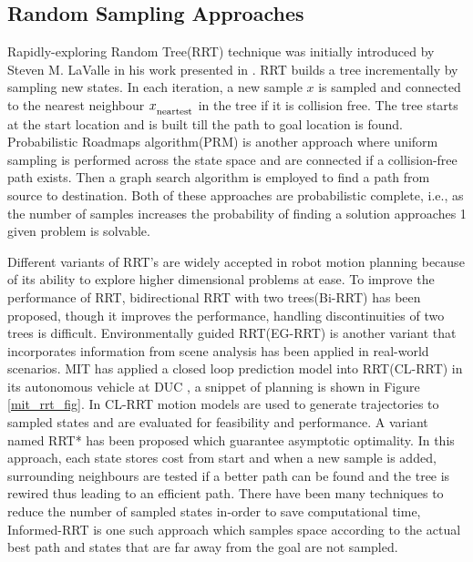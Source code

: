 \subsection{Random Sampling Approaches}
\label{rw_incremental_search}
Rapidly-exploring Random Tree(RRT) technique was initially introduced by Steven M. LaValle in his work presented in \cite{Lavalle_rrt}. RRT builds a tree incrementally by sampling new states. In each iteration, a new sample $x$ is sampled and connected to the nearest neighbour $x_\textsubscript{neartest}$ in the tree if it is collision free. The tree starts at the start location and is built till the path to goal location is found. Probabilistic Roadmaps algorithm\cite{prm}(PRM) is another approach where uniform sampling is performed across the state space and are connected if a collision-free path exists. Then a graph search algorithm is employed to find a path from source to destination. Both of these approaches are probabilistic complete, i.e., as the number of samples increases the probability of finding a solution approaches 1 given problem is solvable.


Different variants of RRT's are widely accepted in robot motion planning because of its ability to explore higher dimensional problems at ease\cite{rrt_higher_dimension}. To improve the performance of RRT, bidirectional RRT with two trees(Bi-RRT) has been proposed, though it improves the performance, handling discontinuities of two trees is difficult\cite{birrt}. Environmentally guided RRT(EG-RRT) is another variant that incorporates information from scene analysis has been applied in real-world scenarios\cite{egrrt}. MIT has applied a closed loop prediction model into RRT(CL-RRT) in its autonomous vehicle at DUC \cite{mit_rrt}, a snippet of planning is shown in Figure \ref{mit_rrt_fig}. In CL-RRT motion models are used to generate trajectories to sampled states and are evaluated for feasibility and performance. A variant named RRT* \cite{rrt_star} has been proposed which guarantee asymptotic optimality. In this approach, each state stores cost from start and when a new sample is added, surrounding neighbours are tested if a better path can be found and the tree is rewired thus leading to an efficient path. There have been many techniques to reduce the number of sampled states in-order to save computational time, Informed-RRT \cite{informed_rrt} is one such approach which samples space according to the actual best path and states that are far away from the goal are not sampled.

